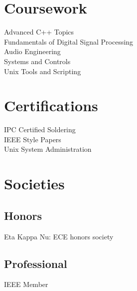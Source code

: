 \documentclass[letterpaper]{deedy-resume-openfont} %
\begin{document}
\begin{minipage}[t]{0.33\textwidth}
\section{Coursework}

Advanced C++ Topics \\
Fundamentals of Digital Signal Processing \\
Audio Engineering \\
 Systems and Controls\\
Unix Tools and Scripting

\section{Certifications}
IPC Certified Soldering \\
IEEE Style Papers \\
Unix System  Administration

\section{Societies}
\subsection{Honors}
 Eta Kappa Nu: ECE honors society \\
\subsection{Professional}
IEEE Member

\sectionspace %

\end{minipage} %
\hfill
%
%
\end{document}
